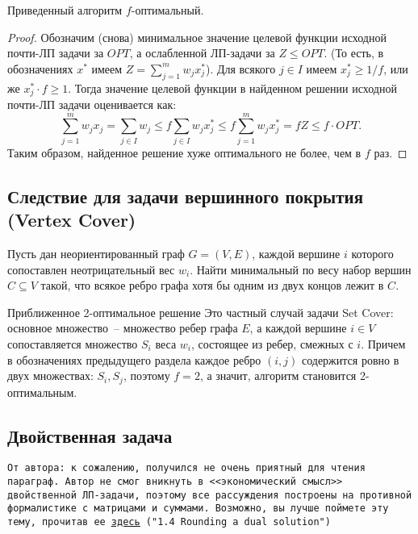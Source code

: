 \begin{theorem*}
    Приведенный алгоритм $f$-оптимальный.
\end{theorem*}
\begin{proof}
    Обозначим (снова) минимальное значение целевой функции исходной почти-ЛП задачи за $OPT$, а ослабленной ЛП-задачи за $Z \leq OPT$.  (То есть, в обозначениях $x^*$ имеем $Z = \sum\limits_{j=1}^m w_j x_j^*$). Для всякого $j\in I$ имеем $x_j^* \geq 1/f$, или же $x_j^*\cdot f \geq 1$. Тогда значение целевой функции в найденном решении исходной почти-ЛП задачи оценивается как:
    $$\sum_{j=1}^m w_j x_j = \sum_{j \in I} w_j \leq f \sum_{j \in I} w_j x_j^* \leq f \sum_{j=1}^m w_j x_j^* = fZ \leq f \cdot OPT.$$ Таким образом, найденное решение хуже оптимального не более, чем в $f$ раз.
\end{proof}

\subsection{Следствие для задачи вершинного покрытия (Vertex Cover)}
\begin{problem*}
	Пусть дан неориентированный граф $G = (V, E)$, каждой вершине $i$ которого сопоставлен неотрицательный вес $w_i$. Найти минимальный по весу набор вершин $C \subseteq V$ такой, что всякое ребро графа хотя бы одним из двух концов лежит в $C$.
\end{problem*}
\begin{algodescription}{Приближенное 2-оптимальное решение} Это частный случай задачи Set Cover: основное множество~-- множество ребер графа $E$, а каждой вершине $i \in V$ сопоставляется множество $S_i$ веса $w_i$, состоящее из ребер, смежных с $i$. Причем в обозначениях предыдущего раздела каждое ребро $(i, j)$ содержится ровно в двух множествах: $S_i, S_j$, поэтому $f = 2$, а значит, алгоритм становится 2-оптимальным.
\end{algodescription}

\subsection{Двойственная задача}
\texttt{От автора: к сожалению, получился не очень приятный для чтения параграф. Автор не смог вникнуть в <<экономический смысл>> двойственной ЛП-задачи, поэтому все рассуждения построены на противной формалистике с матрицами и суммами. Возможно, вы лучше поймете эту тему, прочитав ее
\texttt{\href{https://www.designofapproxalgs.com/book.pdf}{\underline{здесь}}}
("1.4 Rounding a dual solution")
}

